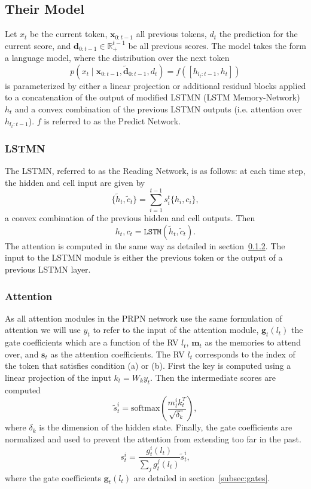 \documentclass{article}
\newcommand{\bd}{\mathbf{d}}
\newcommand{\bx}{\mathbf{x}}
\newcommand{\R}{\mathbb{R}}
\begin{document}
\subsection{Their Model}
Let $x_t$ be the current token, $\bx_{0:t-1}$ all previous tokens,
$d_t$ the prediction for the current score,
and $\bd_{0:t-1}\in\R^{t-1}_+$ be all previous scores.
The model takes the form a language model,
where the distribution over the next token
$$p(x_t\mid \bx_{0:t-1}, \tilde{\bd}_{0:t-1},d_t) = f([h_{l_t:t-1},h_t])$$
is parameterized by either a linear projection or additional residual blocks
applied to a concatenation of the output of modified LSTMN (LSTM Memory-Network) $h_t$
and a convex combination of the previous LSTMN outputs (i.e. attention over $h_{l_t:t-1}$).
$f$ is referred to as the Predict Network.

\subsubsection{LSTMN}
\label{subsec:lstmn}
The LSTMN, referred to as the Reading Network, is as follows:
at each time step, the hidden and cell input are given by
$$\{\tilde{h}_t,\tilde{c}_t\} = \sum_{i=1}^{t-1} s_i^t\{h_i,c_i\},$$
a convex combination of the previous hidden and cell outputs.
Then $$h_t,c_t = \texttt{LSTM}(\tilde{h}_t,\tilde{c}_t).$$
The attention is computed in the same way as detailed in section~\ref{subsec:attn}.
The input to the LSTMN module is either the previous token or the
output of a previous LSTMN layer.

\subsubsection{Attention}
\label{subsec:attn}
As all attention modules in the PRPN network use the same formulation of attention we will use 
$y_t$ to refer to the input of the attention module,
$\bm{g}_t(l_t)$ the gate coefficients which are a function of the RV $l_t$,
$\bm{m}_t$ as the memories to attend over, and $\bm{s}_t$ as the attention coefficients.
The RV $l_t$ corresponds to the index of the token that satisfies condition (a) or (b).
First the key is computed using a linear projection of the input $k_t = W_ky_t$.
Then the intermediate scores are computed
$$\tilde{s}^i_t = \textrm{softmax}\left(\frac{m^i_tk^T_t}{\sqrt{\delta_k}}\right),$$
where $\delta_k$ is the dimension of the hidden state.
Finally, the gate coefficients are normalized and used to prevent the attention from
extending too far in the past.
$$s^i_t = \frac{g^i_t(l_t)}{\sum_jg^j_t(l_t)}\tilde{s}^i_t,$$
where the gate coefficients $\bm{g}_t(l_t)$ are detailed in section~\ref{subsec:gates}.
\end{document}
